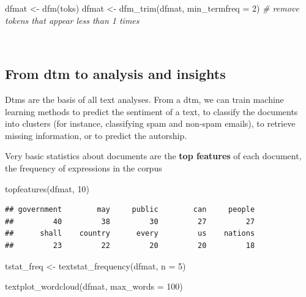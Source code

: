 \documentclass[
  12pt,
]{style/krantz}
\newenvironment{Shaded}{\begin{snugshade}}{\end{snugshade}}
\newcommand{\AttributeTok}[1]{\textcolor[rgb]{0.77,0.63,0.00}{#1}}
\newcommand{\CommentTok}[1]{\textcolor[rgb]{0.56,0.35,0.01}{\textit{#1}}}
\newcommand{\DecValTok}[1]{\textcolor[rgb]{0.00,0.00,0.81}{#1}}
\newcommand{\FunctionTok}[1]{\textcolor[rgb]{0.00,0.00,0.00}{#1}}
\newcommand{\NormalTok}[1]{#1}
\newcommand{\OtherTok}[1]{\textcolor[rgb]{0.56,0.35,0.01}{#1}}
\begin{document}
\begin{Shaded}
\begin{Highlighting}[]
\NormalTok{dfmat }\OtherTok{\textless{}{-}} \FunctionTok{dfm}\NormalTok{(toks)}
\NormalTok{dfmat }\OtherTok{\textless{}{-}} \FunctionTok{dfm\_trim}\NormalTok{(dfmat, }\AttributeTok{min\_termfreq =} \DecValTok{2}\NormalTok{) }\CommentTok{\# remove tokens that appear less than 1 times}
\end{Highlighting}
\end{Shaded}

~

\hypertarget{from-dtm-to-analysis-and-insights}{%
\subsection{From dtm to analysis and insights}\label{from-dtm-to-analysis-and-insights}}

Dtms are the basis of all text analyses. From a dtm, we can train machine learning methods to predict the sentiment of a text, to classify the documents into clusters (for instance, classifying spam and non-spam emails), to retrieve missing information, or to predict the autorship.

Very basic statistics about documents are the \textbf{top features} of each document, the frequency of expressions in the corpus

\begin{Shaded}
\begin{Highlighting}[]
\FunctionTok{topfeatures}\NormalTok{(dfmat, }\DecValTok{10}\NormalTok{)}
\end{Highlighting}
\end{Shaded}

\begin{verbatim}
## government        may     public        can     people 
##         40         38         30         27         27 
##      shall    country      every         us    nations 
##         23         22         20         20         18
\end{verbatim}

\begin{Shaded}
\begin{Highlighting}[]
\NormalTok{tstat\_freq }\OtherTok{\textless{}{-}} \FunctionTok{textstat\_frequency}\NormalTok{(dfmat, }\AttributeTok{n =} \DecValTok{5}\NormalTok{)}

\FunctionTok{textplot\_wordcloud}\NormalTok{(dfmat, }\AttributeTok{max\_words =} \DecValTok{100}\NormalTok{)}
\end{Highlighting}
\end{Shaded}
\end{document}
